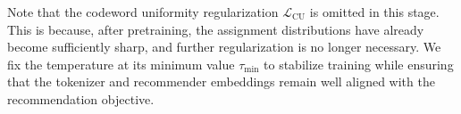 Note that the codeword uniformity regularization $\mathcal{L}_\text{CU}$ is omitted in this stage. This is because, after pretraining, the assignment distributions have already become sufficiently sharp, and further regularization is no longer necessary. We fix the temperature at its minimum value $\tau_{\min}$ to stabilize training while ensuring that the tokenizer and recommender embeddings remain well aligned with the recommendation objective.

